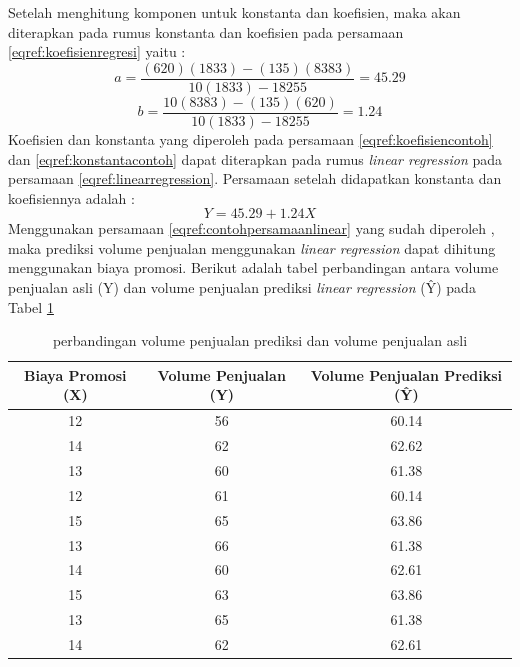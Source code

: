 \documentclass[a4paper,twoside]{article}
\begin{document}
\begin{enumerate}
Setelah menghitung komponen untuk konstanta dan koefisien, maka akan diterapkan pada rumus konstanta dan koefisien pada persamaan \ref{eqref:koefisienregresi} yaitu : 
\begin{equation}
 a = \frac{(620)(1833) - (135)(8383)}{10(1833) -18255 }  = 45.29
 \label{eqref:konstantacontoh}
\end{equation}
\begin{equation}
 b = \frac{10(8383) - (135)(620)}{10(1833) -18255 } = 1.24 
 \label{eqref:koefisiencontoh}
\end{equation}
Koefisien dan konstanta yang diperoleh pada persamaan \ref{eqref:koefisiencontoh} dan \ref{eqref:konstantacontoh}  dapat diterapkan pada rumus \textit{linear regression} pada persamaan \ref{eqref:linearregression}. Persamaan setelah didapatkan konstanta dan koefisiennya adalah : 
\begin{equation}
  Y = 45.29 + 1.24X
  \label{eqref:contohpersamaanlinear}
\end{equation}
Menggunakan persamaan \ref{eqref:contohpersamaanlinear} yang sudah diperoleh , maka prediksi volume penjualan menggunakan \textit{linear regression} dapat dihitung menggunakan biaya promosi. Berikut adalah tabel perbandingan antara volume penjualan asli (Y) dan volume penjualan prediksi \textit{linear regression} (\^{Y}) pada Tabel \ref{tab:perbandinganlinearregression}

\pagebreak

\begin{table}[ht]
\centering
\begin{tabular}{|c|c|c|}
\hline 
Biaya Promosi (X) & Volume Penjualan (Y) & Volume Penjualan Prediksi (\^{Y}) \\ 
\hline 
12 & 56 & 60.14 \\ 
\hline 
14 & 62 & 62.62 \\ 
\hline 
13 & 60 & 61.38 \\ 
\hline 
12 & 61 & 60.14 \\ 
\hline 
15 & 65 & 63.86 \\ 
\hline 
13 & 66 & 61.38 \\ 
\hline 
14 & 60 & 62.61 \\ 
\hline 
15 & 63 & 63.86 \\ 
\hline 
13 & 65 & 61.38 \\ 
\hline 
14 & 62 & 62.61 \\ 
\hline 
\end{tabular} 
\caption{perbandingan volume penjualan prediksi dan volume penjualan asli}
\label{tab:perbandinganlinearregression}
\end{table}


\end{enumerate}
\end{document}
